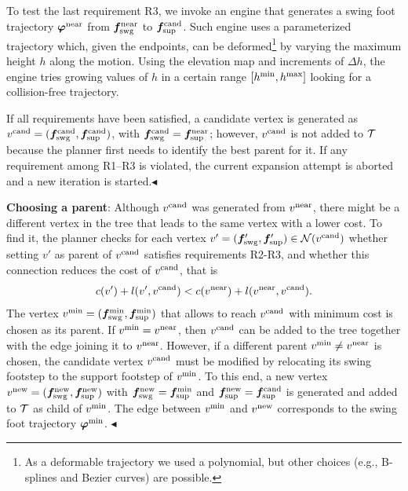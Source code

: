 To test the last requirement R3, we invoke an engine that generates a swing foot trajectory ${\bm{\varphi}}^{\rm near}$ from ${\bm{f}}_{\rm swg}^{\rm near}$ to ${\bm{f}}_{\rm sup}^{\rm cand}$. Such engine uses a parameterized trajectory which, given the endpoints, can be deformed\footnote{As a deformable trajectory we used a polynomial, but other choices (e.g., B-splines and Bezier curves) are possible.} by varying the maximum height $h$ along the motion. 
Using the elevation map and increments of $\Delta h$, the engine tries growing values of $h$ in a certain range $[h^{\rm min}, h^{\rm max}]$ looking for a collision-free trajectory.

If all requirements have been satisfied, a candidate vertex is generated as $v^{\rm cand} = ({\bm{f}}_{\rm swg}^{\rm cand}, {\bm{f}}_{\rm sup}^{\rm cand})$, with ${\bm{f}}_{\rm swg}^{\rm cand} = {\bm{f}}_{\rm sup}^{\rm near}$; however, $v^{\rm cand}$ is not added to $\cal T$ because the planner first needs to identify the best parent for it.
If any requirement among R1--R3 is violated, the current expansion attempt is aborted and a new iteration is started.\hfill $\blacktriangleleft$

{\bf Choosing a parent}: Although $v^{\rm cand}$ was generated from $v^{\rm near}$, there might be a different vertex in the tree that leads to the same vertex with a lower cost. To find it, the planner checks for each vertex $v' = ({\bm{f}}'_{\rm swg}, {\bm{f}}'_{\rm sup})\in {\cal N} (v^{\rm cand})$ whether setting $v'$ as parent of $v^{\rm cand}$ satisfies requirements R2-R3, and whether this connection reduces the cost of $v^{\rm cand}$, that is 
\[
c(v') + l(v', v^{\rm cand}) < c(v^{\rm near}) + l(v^{\rm near}, v^{\rm cand}).
\]
The vertex $v^{\rm min} = ({\bm{f}}_{\rm swg}^{\rm min}, {\bm{f}}_{\rm sup}^{\rm min})$ that allows to reach $v^{\rm cand}$ with minimum cost is chosen as its parent. If $v^{\rm min} = v^{\rm near}$, then $v^{\rm cand}$ can be added to the tree together with the edge joining it to $v^{\rm near}$. However, if a different parent $v^{\rm min} \neq v^{\rm near}$ is chosen, the candidate vertex $v^{\rm cand}$ must be modified by relocating its swing footstep to the support footstep of $v^{\rm min}$.
To this end, a new vertex $v^{\rm new} = ({\bm{f}}_{\rm swg}^{\rm new}, {\bm{f}}_{\rm sup}^{\rm new})$ with ${\bm{f}}_{\rm swg}^{\rm new} = {\bm{f}}_{\rm sup}^{\rm min}$ and ${\bm{f}}_{\rm sup}^{\rm new} = {\bm{f}}_{\rm sup}^{\rm cand}$ is generated and added to ${\cal T}$ as child of $v^{\rm min}$. The edge between $v^{\rm min}$ and $v^{\rm new}$ corresponds to the swing foot trajectory ${\bm{\varphi}}^{\rm min}$. 
\hfill $\blacktriangleleft$


